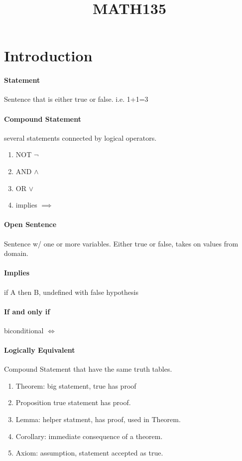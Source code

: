 \documentclass[12pt]{article}
\begin{document}
\title{MATH135}
\section{Introduction}
\paragraph{Statement}Sentence that is either true or false. i.e. 1+1=3
\paragraph{Compound Statement} several statements connected by logical operators.
\begin{enumerate}
\item NOT $\neg$
\item AND  $\wedge$

\item OR $\lor$
\item implies $\implies$
\end{enumerate}
\paragraph{Open Sentence}Sentence w/ one or more variables. Either true or false, takes on values from domain.
\paragraph{Implies} if A then B, undefined with false hypothesis
\paragraph{If and only if} biconditional $\iff$
\paragraph {Logically Equivalent} Compound Statement  that have the same truth
tables.
\begin{enumerate}
  \item Theorem: big statement, true has proof
  \item Proposition true statement has proof.
  \item Lemma: helper statment, has proof, used in Theorem.
  \item Corollary: immediate consequence of a theorem.
  \item Axiom: assumption, statement accepted as true.
\end{enumerate}
\end{document}
